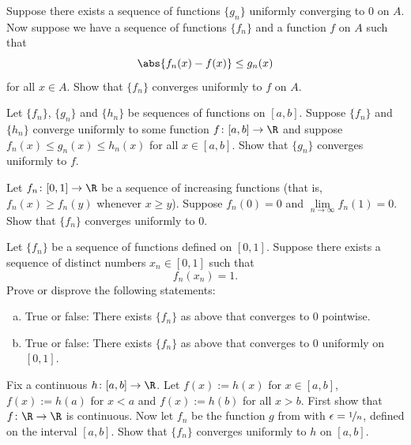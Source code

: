 \documentclass[12pt]{book}
\begin{document}
\begin{exercise}
Suppose there exists a sequence of functions $\{ g_n \}$ uniformly
converging to $0$ on $A$.
Now suppose we have a sequence of functions
$\{ f_n \}$ and a function $f$ on $A$ such that
\begin{equation*}
\abs{f_n(x) - f(x)} \leq g_n(x) 
\end{equation*}
for all $x \in A$.
Show that $\{ f_n \}$ converges uniformly to $f$ on $A$.
\end{exercise}

\begin{exercise}
Let $\{ f_n \}$, $\{ g_n \}$ and $\{ h_n \}$ be sequences of functions on
$[a,b]$.
Suppose $\{ f_n \}$ and $\{ h_n \}$ converge uniformly to some function
$f \colon [a,b] \to \R$ and suppose $f_n(x) \leq g_n(x) \leq h_n(x)$
for all $x \in [a,b]$.
Show that $\{ g_n \}$ converges uniformly to $f$.
\end{exercise}

\begin{exercise}
Let $f_n \colon [0,1] \to \R$ be a sequence of increasing functions (that
is, $f_n(x) \geq f_n(y)$ whenever $x \geq y$).
Suppose $f_n(0) = 0$
and $\lim\limits_{n \to \infty} f_n(1) = 0$.
Show that
$\{ f_n \}$
converges uniformly to $0$.
\end{exercise}

\begin{exercise}
Let $\{f_n\}$ be a sequence of functions defined on $[0,1]$.
Suppose there exists a sequence of distinct numbers $x_n \in [0,1]$ such that
\begin{equation*}
f_n(x_n) = 1 .
\end{equation*}
Prove or disprove the following statements:
\begin{enumerate}[a)]
 \item True or false: There exists $\{ f_n \}$ as above that converges to $0$
pointwise.
  \item True or false: There exists $\{ f_n \}$ as above that converges to $0$
uniformly on $[0,1]$.
\end{enumerate}
\end{exercise}

\begin{exercise}
Fix a continuous $h \colon [a,b] \to \R$.
Let $f(x) := h(x)$ for $x \in [a,b]$,
$f(x) := h(a)$ for $x < a$ and $f(x) := h(b)$ for all $x > b$.
First show
that $f \colon \R \to \R$ is continuous.
Now let $f_n$ be
the function $g$ from  with
$\epsilon = \nicefrac{1}{n}$, defined on the interval $[a,b]$.
Show that $\{
f_n \}$ converges uniformly to $h$ on $[a,b]$.
\end{exercise}
\end{document}
